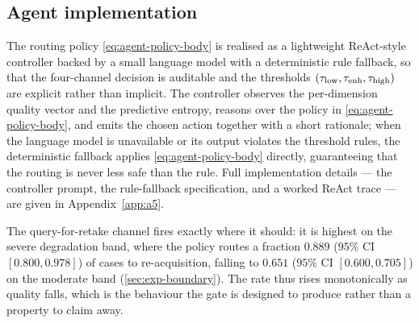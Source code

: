 \subsection{Agent implementation}\label{sec:agent-impl}
The routing policy \eqref{eq:agent-policy-body} is realised as a lightweight ReAct-style controller
backed by a small language model with a deterministic rule fallback, so that the four-channel
decision is auditable and the thresholds $(\tau_{\mathrm{low}},\tau_{\mathrm{enh}},\tau_{\mathrm{high}})$ are explicit rather than
implicit. The controller observes the per-dimension quality vector and the predictive entropy,
reasons over the policy in \eqref{eq:agent-policy-body}, and emits the chosen action together with a
short rationale; when the language model is unavailable or its output violates the threshold rules,
the deterministic fallback applies \eqref{eq:agent-policy-body} directly, guaranteeing that the
routing is never less safe than the rule. Full implementation details --- the controller prompt, the
rule-fallback specification, and a worked ReAct trace --- are given in Appendix~\ref{app:a5}.

The query-for-retake channel fires exactly where it should: it is highest on the severe degradation
band, where the policy routes a fraction $0.889$ ($95\%$ CI $[0.800, 0.978]$) of cases to
re-acquisition, falling to $0.651$ ($95\%$ CI $[0.600, 0.705]$) on the moderate band
(\cref{sec:exp-boundary}). The rate thus rises monotonically as quality falls, which is the behaviour
the gate is designed to produce rather than a property to claim away.

